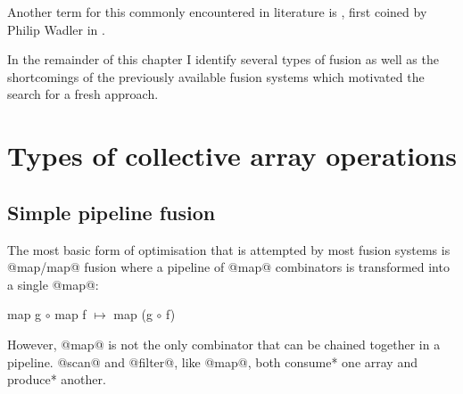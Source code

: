 \documentclass[preamble.tex]{subfiles}
\begin{document}
Another term for this commonly encountered in literature is , first coined by Philip Wadler in \cite{Wad90}.

In the remainder of this chapter I identify several types of fusion as well as the shortcomings of the previously available fusion systems which motivated the search for a fresh approach.






\clearpage
\section{Types of collective array operations}


\subsection{Simple pipeline fusion}
\label{sec:straight-line}

The most basic form of optimisation that is attempted by most fusion systems is @map/map@ fusion where a pipeline of @map@ combinators is transformed into a single @map@:

\begin{hscode}[mathescape]
map g $\circ$ map f $\mapsto$ map (g $\circ$ f)
\end{hscode}

However, @map@ is not the only combinator that can be chained together in a pipeline. @scan@ and @filter@, like @map@, both \*consume* one array and \*produce* another.
\end{document}

